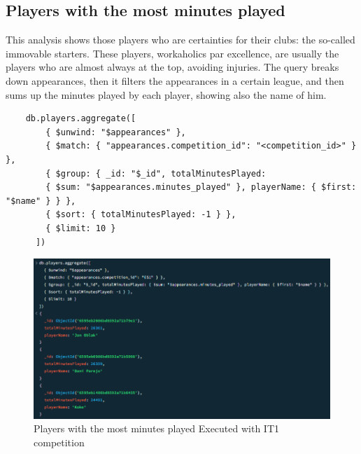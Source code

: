 \documentclass{Configuration_Files/PoliMi3i_thesis}
\begin{document}
\subsection{Players with the most minutes played}
This analysis shows those players who are certainties for their clubs: the so-called immovable starters. These players, workaholics par excellence, are usually the players who are almost always at the top, avoiding injuries. The query breaks down appearances, then it filters the appearances in a certain league, and then sums up the minutes played by each player, showing also the name of him.
\begin{verbatim}
    db.players.aggregate([
        { $unwind: "$appearances" },
        { $match: { "appearances.competition_id": "<competition_id>" } },
        { $group: { _id: "$_id", totalMinutesPlayed: 
        { $sum: "$appearances.minutes_played" }, playerName: { $first: "$name" } } },
        { $sort: { totalMinutesPlayed: -1 } },
        { $limit: 10 }
      ])      
\end{verbatim}
\begin{figure}[htbp]
    \centering
    \includegraphics[scale=0.9]{Images/Queries/Competitions_statistics/minutes-played/ES1.png}
    \caption{Players with the most minutes played Executed with IT1 competition}
\end{figure}
\end{document}
